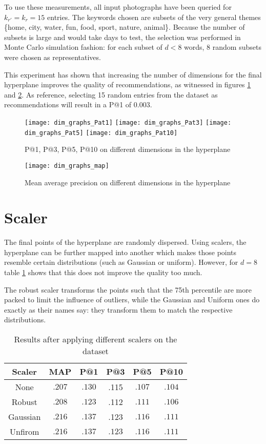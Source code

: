 To use these measurements, all input photographs have been queried for $k_{r'}= k_r =15$ entries. The keywords chosen are subsets of the very general themes \{home, city, water, fun, food, sport, nature, animal\}. Because the number of subsets is large and would take days to test, the selection was performed in Monte Carlo simulation fashion: for each subset of $d < 8$ words, 8 random subsets were chosen as representatives.

This experiment has shown that increasing the number of dimensions for the final hyperplane improves the quality of recommendations, as witnessed in figures \ref{fig:dims} and \ref{fig:dims_map}. As reference, selecting 15 random entries from the dataset as recommendations will result in a P@1 of $0.003$.

\begin{figure}[b!]
\centering
\texttt{[image: dim\_graphs\_Pat1]}
\texttt{[image: dim\_graphs\_Pat3]}
\texttt{[image: dim\_graphs\_Pat5]}
\texttt{[image: dim\_graphs\_Pat10]}
\caption{P@1, P@3, P@5, P@10 on different dimensions in the hyperplane}
\label{fig:dims}
\end{figure}

\begin{figure}[b!]
\centering
\texttt{[image: dim\_graphs\_map]}
\caption{ Mean average precision on different dimensions in the hyperplane}
\label{fig:dims_map}
\end{figure}


\section{Scaler}
\label{sec:results_scaler}

The final points of the hyperplane are randomly dispersed. Using scalers, the hyperplane can be further mapped into another which makes those points resemble certain distributions (such as Gaussian or uniform). However, for $d=8$ table \ref{table:scalers} shows that this does not improve the quality too much.

The robust scaler transforms the points such that the 75th percentile are more packed to limit the influence of outliers, while the Gaussian and Uniform ones do exactly as their names say: they transform them to match the respective distributions.

\begin{table}[b!]
\centering
\label{table:scalers}
\begin{tabular}{| | c c c c c c | |}
	\hline
		Scaler & MAP & P@1 & P@3 & P@5 & P@10 \\
	\hline
		None & $.207$ & $.130$ & .115 & $.107$ & $.104$ \\
		Robust   & $.208$ & $.123$ & .112 & $.111$ & $.106$ \\
		Gaussian  & $.216$ & $.137$ & .123 & $.116$ & $.111$ \\
		Unfirom  & $.216$ & $.137$ & $.123$ & $.116$ & $.111$ \\
\hline
\end{tabular}
\caption{Results after applying different scalers on the dataset}
\end{table}

